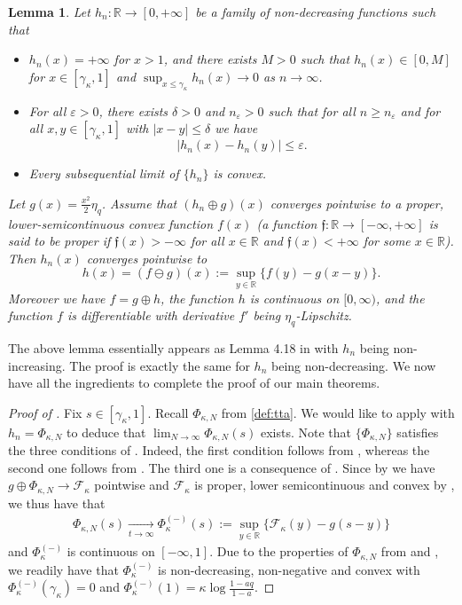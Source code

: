 \documentclass[reqno,11pt]{amsart}
\newcommand{\e}{\varepsilon}
\newcommand{\logq}{\eta_q}
\newcommand{\lln}{\gamma_\kappa}
\numberwithin{equation}{section}
\newtheorem{lemma}[proposition]{Lemma}
\theoremstyle{definition}
\newcommand{\R}{\mathbb{R}}
\begin{document}
    \begin{lemma} \label{lem:deconv1}
        Let $h_n:\mathbb{R} \to [0,+\infty]$ be a family of non-decreasing functions such that
        \begin{itemize}[leftmargin=20pt]
            \item $h_n(x)=+\infty$ for $x>1$, and there exists $M>0$ such that $h_n(x)\in[0,M]$ for $x\in [\lln,1]$ and $\sup_{x\le \lln} h_n(x) \to 0$ as $n\to \infty$.
            \item For all $\varepsilon>0$, there exists $\delta>0$ and $n_\e>0$ such that for all $n\ge n_\e$ and for all $x,y \in [\lln,1]$ with $|x-y|\le \delta$  we have $$|h_n(x)-h_n(y)|\le \varepsilon.$$
            \item Every subsequential limit of $\{h_n\}$ is convex.
        \end{itemize}
          Let $g(x)=\frac{x^2}{2}\logq$. Assume that $(h_n \oplus g)(x)$ converges pointwise to a proper, lower-semicontinuous convex function $f(x)$ (a function $\mathfrak{f}:\mathbb{R}\to [-\infty,+\infty]$ is said to be proper if $\mathfrak{f}(x)>-\infty$ for all $x\in \mathbb{R}$ and $\mathfrak{f}(x)<+\infty$ for some $x\in \mathbb{R}$). Then $h_n(x)$ converges pointwise to  $$h(x)=(f\ominus g)(x) := \sup_{y\in\R} \{ f(y) - g(x-y) \}.$$ Moreover we have $f=g\oplus h$,  the function $h$ is continuous on $[0,\infty)$, and the function $f$ is differentiable with derivative $f'$ being $\logq$-Lipschitz.
    \end{lemma}

  The above lemma essentially appears as Lemma 4.18 in \cite{das2023large} with $h_n$ being non-increasing. The proof is exactly the same for $h_n$ being non-decreasing. We now have all the ingredients to complete the proof of our main theorems.

    



    \begin{proof}[Proof of ] Fix $s\in [\lln,1]$. Recall $\Phi_{\kappa,N}$ from \eqref{def:tta}. We would like to apply  with $h_n = \Phi_{\kappa,N}$ to deduce that $\lim_{N\to\infty} \Phi_{\kappa,N}(s)$ exists. Note that $\{\Phi_{\kappa,N}\}$ satisfies the three conditions of . Indeed, the first condition follows from , whereas the second one follows from . The third one is a consequence of . Since by  we have $g\oplus\Phi_{\kappa,N}\to \mathcal{F}_\kappa$ pointwise and $\mathcal{F}_\kappa$ is proper, lower semicontinuous and convex by , we thus have that
    \begin{align*}
        \Phi_{\kappa,N}(s)\xrightarrow[t\to\infty]{} \Phi_\kappa^{(-)}(s):=\sup_{y\in \R} \{\mathcal{F}_\kappa(y)-g(s-y)\}
    \end{align*}
and $\Phi_\kappa^{(-)}$ is continuous on $[-\infty,1]$. Due to the properties of $\Phi_{\kappa,N}$ from  and , we readily have that $\Phi_\kappa^{(-)}$ is non-decreasing, non-negative and convex with $\Phi_\kappa^{(-)}(\lln)=0$ and $\Phi_\kappa^{(-)}(1)=\kappa \log\frac{1-aq}{1-a}$. 
    \end{proof}
   
\end{document}
